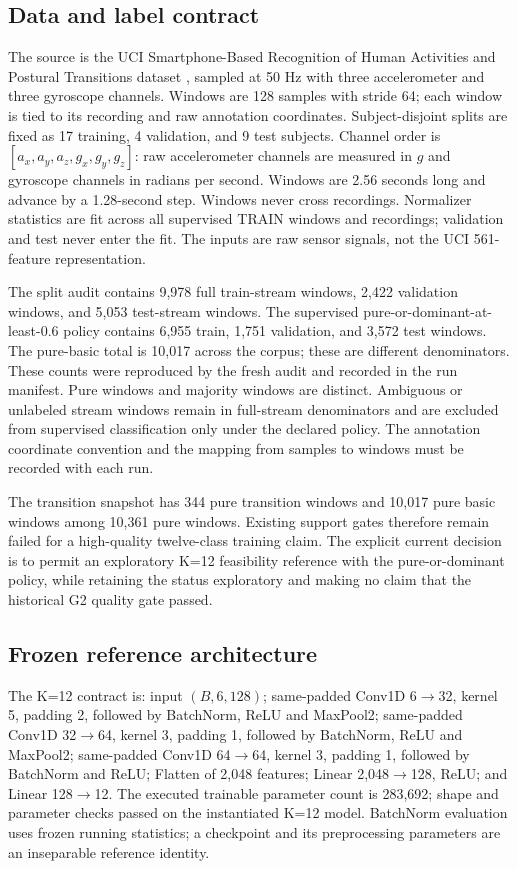 \documentclass[11pt,a4paper]{article}
\begin{document}
\subsection{Data and label contract}
The source is the UCI Smartphone-Based Recognition of Human Activities and
Postural Transitions dataset \cite{uci}, sampled at 50 Hz with three accelerometer and
three gyroscope channels. Windows are 128 samples with stride 64; each window
is tied to its recording and raw annotation coordinates. Subject-disjoint
splits are fixed as 17 training, 4 validation, and 9 test subjects. Channel
order is $[a_x,a_y,a_z,g_x,g_y,g_z]$: raw accelerometer channels are measured
in $g$ and gyroscope channels in radians per second. Windows are 2.56 seconds
long and advance by a 1.28-second step. Windows never cross recordings.
Normalizer statistics are fit across all supervised TRAIN windows and
recordings; validation and test never enter the fit. The inputs are raw sensor
signals, not the UCI 561-feature representation.

The split audit contains 9,978 full train-stream windows, 2,422 validation
windows, and 5,053 test-stream windows. The supervised
pure-or-dominant-at-least-0.6 policy contains 6,955 train, 1,751 validation,
and 3,572 test windows. The pure-basic total is 10,017 across the corpus;
these are different denominators. These counts were reproduced by the fresh
audit and recorded in the run manifest. Pure windows and
majority windows are distinct. Ambiguous or unlabeled stream windows remain
in full-stream denominators and are excluded from supervised classification
only under the declared policy. The annotation coordinate convention and the
mapping from samples to windows must be recorded with each run.

The transition snapshot has 344 pure transition windows and 10,017 pure basic
windows among 10,361 pure windows. Existing support gates therefore remain
failed for a high-quality twelve-class training claim. The explicit current
decision is to permit an exploratory K=12 feasibility reference with the
pure-or-dominant policy, while retaining the status exploratory and making no
claim that the historical G2 quality gate passed.

\subsection{Frozen reference architecture}
The K=12 contract is: input $(B,6,128)$; same-padded Conv1D
6$\to$32, kernel 5, padding 2, followed by BatchNorm, ReLU and MaxPool2;
same-padded Conv1D 32$\to$64, kernel 3, padding 1, followed by BatchNorm,
ReLU and MaxPool2; same-padded Conv1D 64$\to$64, kernel 3, padding 1,
followed by BatchNorm and ReLU; Flatten of 2,048 features; Linear
2,048$\to$128, ReLU; and Linear 128$\to$12. The executed trainable parameter
count is 283,692; shape and parameter checks passed on the instantiated K=12
model. BatchNorm evaluation uses frozen running statistics; a checkpoint
and its preprocessing parameters are an inseparable reference identity.
\end{document}
